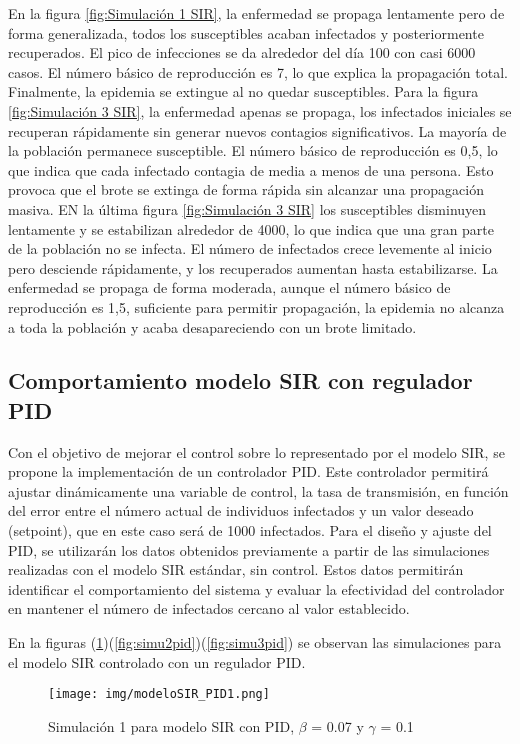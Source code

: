 En la figura \ref{fig:Simulación 1 SIR}, la enfermedad se propaga lentamente pero de forma generalizada, todos los susceptibles acaban infectados y posteriormente recuperados. El pico de infecciones se da alrededor del día 100 con casi 6000 casos. El número básico de reproducción es 7, lo que explica la propagación total. Finalmente, la epidemia se extingue al no quedar susceptibles.
Para la figura \ref{fig:Simulación 3 SIR}, la enfermedad apenas se propaga, los infectados iniciales se recuperan rápidamente sin generar nuevos contagios significativos. La mayoría de la población permanece susceptible. El número básico de reproducción es 0,5, lo que indica que cada infectado contagia de media a menos de una persona. Esto provoca que el brote se extinga de forma rápida sin alcanzar una propagación masiva.
EN la última figura \ref{fig:Simulación 3 SIR} los susceptibles disminuyen lentamente y se estabilizan alrededor de 4000, lo que indica que una gran parte de la población no se infecta. El número de infectados crece levemente al inicio pero desciende rápidamente, y los recuperados aumentan hasta estabilizarse. La enfermedad se propaga de forma moderada, aunque el número básico de reproducción es 1,5, suficiente para permitir propagación, la epidemia no alcanza a toda la población y acaba desapareciendo con un brote limitado.

\subsection{Comportamiento modelo SIR con regulador PID}
Con el objetivo de mejorar el control sobre lo representado por el modelo SIR, se propone la implementación de un controlador PID. Este controlador permitirá ajustar dinámicamente una variable de control, la tasa de transmisión, en función del error entre el número actual de individuos infectados y un valor deseado (setpoint), que en este caso será de 1000 infectados. Para el diseño y ajuste del PID, se utilizarán los datos obtenidos previamente a partir de las simulaciones realizadas con el modelo SIR estándar, sin control. Estos datos permitirán identificar el comportamiento del sistema y evaluar la efectividad del controlador en mantener el número de infectados cercano al valor establecido.

En la figuras (\ref{fig:simu1pid})(\ref{fig:simu2pid})(\ref{fig:simu3pid}) se observan las simulaciones para el modelo SIR controlado con un regulador PID.

\begin{figure}[H]
    \centering
    \texttt{[image: img/modeloSIR\_PID1.png]}
    \caption{Simulación 1 para modelo SIR con PID, $\beta$ = 0.07 y $\gamma$ = 0.1}
    \label{fig:simu1pid}
    \vspace{0.5cm} %
\end{figure}

